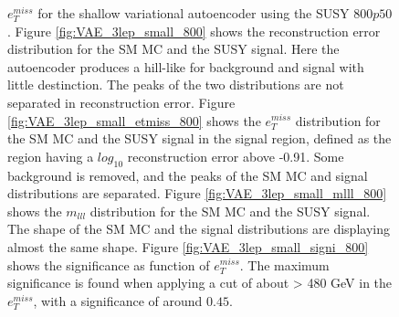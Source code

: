 \begin{figure}[!htb]
{    $e_T^{miss}$ for the shallow variational autoencoder using the SUSY $800p50$.
    Figure \ref{fig:VAE_3lep_small_800} shows the reconstruction error 
    distribution for the SM MC and the SUSY signal. Here the autoencoder produces a hill-like for background and 
    signal with little destinction. The peaks of the two distributions are not separated in reconstruction error. Figure \ref{fig:VAE_3lep_small_etmiss_800} 
    shows the $e_T^{miss}$ distribution for the SM MC and the SUSY signal in the signal region, defined as the region having a $log_{10}$ reconstruction error above -0.91. 
    Some background is removed, and the peaks of the SM MC and signal 
    distributions are separated. Figure \ref{fig:VAE_3lep_small_mlll_800} shows the $m_{lll}$ distribution for the SM MC and the SUSY signal. 
    The shape of the SM MC and the signal distributions are displaying almost the same shape. Figure \ref{fig:VAE_3lep_small_signi_800} shows the significance as 
    function of $e_T^{miss}$. The maximum significance is found when applying a cut of about > 480 GeV in the $e_T^{miss}$, with a significance of around $0.45$.}
    \label{fig:VAE_3lep_small_rec_sig_signi_800}
\end{figure}

